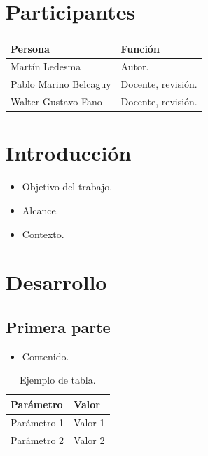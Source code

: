 \documentclass[11pt,a4paper]{article}
\begin{document}
\section*{Participantes}
\begin{tabular}{@{}lp{10cm}@{}}
  \toprule
  Persona & Función \\
  \midrule
  Martín Ledesma        & Autor. \\
  Pablo Marino Belcaguy & Docente, revisión. \\
  Walter Gustavo Fano   & Docente, revisión. \\
  \bottomrule
\end{tabular}

\tableofcontents
\newpage

\section{Introducción}

\begin{itemize}
  \item Objetivo del trabajo.
  \item Alcance.
  \item Contexto.
\end{itemize}

\section{Desarrollo}

\subsection{Primera parte}

\begin{itemize}
  \item Contenido.
\end{itemize}

\begin{table}[H]
  \centering
  \begin{tabular}{@{}ll@{}}
    \toprule
    Parámetro & Valor \\
    \midrule
    Parámetro 1 & Valor 1 \\
    Parámetro 2 & Valor 2 \\
    \bottomrule
  \end{tabular}
  \caption{Ejemplo de tabla.}
  \label{tab:ejemplo}
\end{table}
\end{document}

